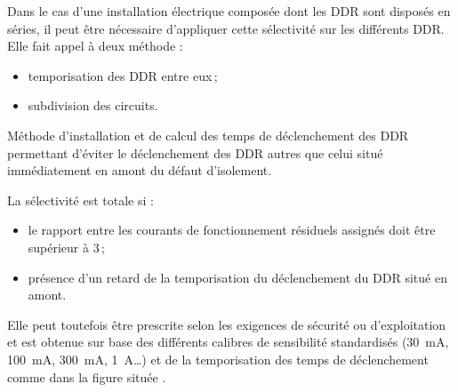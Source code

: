 Dans le cas d'une installation électrique composée dont les DDR sont disposés en séries, il peut être nécessaire d'appliquer cette sélectivité sur les différents DDR. Elle fait appel à deux méthode : 
\begin{itemize}
\item temporisation des DDR entre eux\,;
\item subdivision des circuits.
\end{itemize}

\begin{definition}
Méthode d'installation et de calcul des temps de déclenchement des DDR permettant d'éviter le déclenchement des DDR autres que celui situé immédiatement en amont du défaut d'isolement.
\end{definition}

La sélectivité est totale si :
\begin{itemize}
\item le rapport entre les courants de fonctionnement résiduels assignés doit être supérieur à 3\,;
\item présence d'un retard de la temporisation du déclenchement du DDR situé en amont.
\end{itemize}
Elle peut toutefois être prescrite selon les exigences de sécurité ou d'exploitation et est obtenue sur base des différents calibres de sensibilité standardisés (\SI{30}{\milli\ampere}, \SI{100}{\milli\ampere}, \SI{300}{\milli\ampere}, \SI{1}{\ampere}\ldots) et de la temporisation des temps de déclenchement comme dans la figure située .



